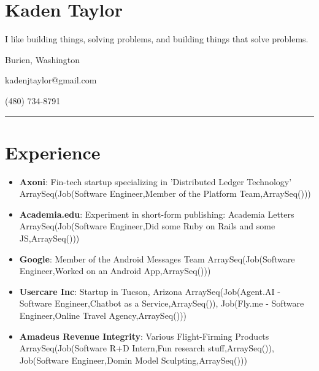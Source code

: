 \documentclass{article}
\begin{document}
\section*{Kaden Taylor}

I like building things, solving problems, and building things that solve problems.
\newline

Burien, Washington

kadenjtaylor@gmail.com

(480) 734-8791

\noindent\rule{\linewidth}{1pt}

\section*{Experience}

\begin{itemize}\item \textbf{Axoni}: Fin-tech startup specializing in 'Distributed Ledger Technology' \newline ArraySeq(Job(Software Engineer,Member of the Platform Team,ArraySeq()))
\newline
\newline\item \textbf{Academia.edu}: Experiment in short-form publishing: Academia Letters \newline ArraySeq(Job(Software Engineer,Did some Ruby on Rails and some JS,ArraySeq()))
\newline
\newline\item \textbf{Google}: Member of the Android Messages Team \newline ArraySeq(Job(Software Engineer,Worked on an Android App,ArraySeq()))
\newline
\newline\item \textbf{Usercare Inc}: Startup in Tucson, Arizona \newline ArraySeq(Job(Agent.AI - Software Engineer,Chatbot as a Service,ArraySeq()), Job(Fly.me - Software Engineer,Online Travel Agency,ArraySeq()))
\newline
\newline\item \textbf{Amadeus Revenue Integrity}: Various Flight-Firming Products \newline ArraySeq(Job(Software R+D Intern,Fun research stuff,ArraySeq()), Job(Software Engineer,Domin Model Sculpting,ArraySeq()))\end{itemize}
\end{document}
